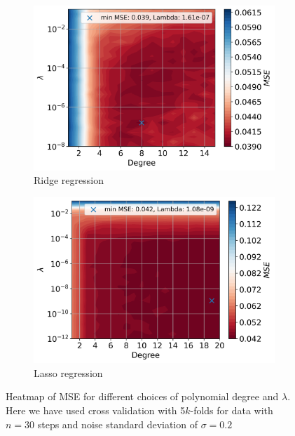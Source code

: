 \documentclass[12pt]{article}
\begin{document}
\begin{figure}[H]

  \begin{subfigure}{.5\textwidth}
    \centering
    \includegraphics[width=\textwidth]{../figures/best_lambda_RIDGE_02.png}
    \caption{Ridge regression}
    \label{fig:}
  \end{subfigure}
  \begin{subfigure}{.5\textwidth}
    \centering
    \includegraphics[width=\textwidth]{../figures/best_lambda_LASSO_02.png}
    \caption{Lasso regression}
    \label{fig:}
  \end{subfigure}
  \caption{Heatmap of MSE for different choices of polynomial degree and $\lambda$. Here we have used cross validation with 5$k$-folds for data with $n=30$ steps and noise standard deviation of $\sigma=0.2$}
  \label{fig:heat_franke}
\end{figure}
\end{document}
